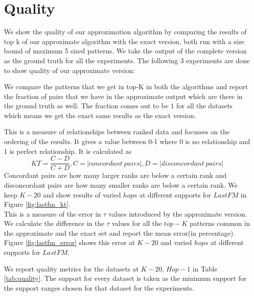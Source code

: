 \newpage
\section{Quality}
We show the quality of our approximation algorithm by comparing the results of top k of our approximate algorithm with the exact version, both run with a size bound of maximum 5 sized patterns. We take the output of the complete version as the ground truth for all the experiments. The following 3 experiments are done to show quality of our approximate version:

 We compare the patterns that we get in top-K in both the algorithms and report the fraction of pairs that we have in the approximate output which are there in the ground truth as well. The fraction comes out to be $1$ for all the datasets which means we get the exact same results as the exact version.

 This is a measure of relationships between ranked data and focusses on the ordering of the results. It gives a value between 0-1 where 0 is no relationship and 1 is perfect relationship. It is calculated as \[KT = \dfrac{C-D}{C+D}, C = |concordant\ pairs|, D = |disconcordant\ pairs|\] Concordant pairs are how many larger ranks are below a certain rank and disconcordant pairs are how many smaller ranks are below a certain rank. We keep $K-20$ and show results of varied $hops$ at different supports for $LastFM$ in Figure \ref{fig:lastfm_kt}.\\ 

 This is a measure of the error in $\tau$ values introduced by the approximate version. We calculate the difference in the $\tau$ values for all the $top-K$ patterns common in the approximate and the exact set and report the mean error(in percentage). Figure \ref{fig:lastfm_error} shows this error at $K-20$ and varied $hops$ at different supports for $LastFM$.

\par We report quality metrics for the datasets at $K-20$, $Hop-1$ in Table \ref{tab:quality}. The support for every dataset is taken as the minimum support for the support ranges chosen for that dataset for the experiments. 

